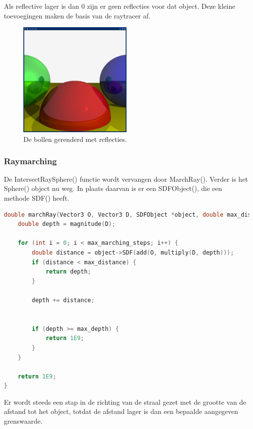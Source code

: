 \documentclass[12pt, a4paper]{article}
\begin{document}
Als reflective lager is dan 0 zijn er geen reflecties voor dat object. Deze kleine toevoegingen maken de basis van de raytracer af.

\begin{figure}[H]
    \centering
    \includegraphics[width=0.50\textwidth]{renders/reflection.png}
    \caption{De bollen gerenderd met reflecties.}
    \label{fig:reflection}
\end{figure}

\subsubsection{Raymarching}

De IntersectRaySphere() functie wordt vervangen door MarchRay(). Verder is het Sphere() object nu weg. In plaats daarvan is er een SDFObject(), die een methode SDF() heeft.

\begin{lstlisting}[language=C++]
double marchRay(Vector3 O, Vector3 D, SDFObject *object, double max_distance, int max_marching_steps, double max_depth) {
    double depth = magnitude(D);

    for (int i = 0; i < max_marching_steps; i++) {
        double distance = object->SDF(add(O, multiply(D, depth)));
        if (distance < max_distance) {
            return depth;
        }

        depth += distance;


        if (depth >= max_depth) {
            return 1E9;
        }
    }

    return 1E9;
}
\end{lstlisting}

Er wordt steeds een stap in de richting van de straal gezet met de grootte van de afstand tot het object, totdat de afstand lager is dan een bepaalde aangegeven grenswaarde.
\end{document}
